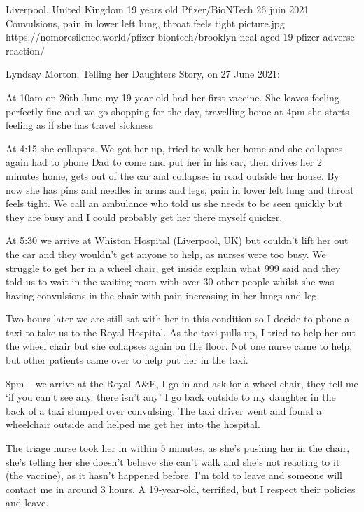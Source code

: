           {Liverpool, United Kingdom}
          {19 years old}
          {Pfizer/BioNTech}
          {26 juin 2021}
          {Convulsions, pain in lower left lung, throat feels tight
          }
          {picture.jpg}
          {https://nomoresilence.world/pfizer-biontech/brooklyn-neal-aged-19-pfizer-adverse-reaction/}
          {

\normalsize

Lyndsay Morton, Telling her Daughters Story, on 27 June 2021:

At 10am on 26th June my 19-year-old had her first vaccine. She leaves feeling
perfectly fine and we go shopping for the day, travelling home at 4pm she starts
feeling as if she has travel sickness

At 4:15 she collapses. We got her up, tried to walk her home and she collapses
again had to phone Dad to come and put her in his car, then drives her 2 minutes
home, gets out of the car and collapses in road outside her house. By now she
has pins and needles in arms and legs, pain in lower left lung and throat feels
tight. We call an ambulance who told us she needs to be seen quickly but they
are busy and I could probably get her there myself quicker.

At 5:30 we arrive at Whiston Hospital (Liverpool, UK) but couldn’t lift her out
the car and they wouldn’t get anyone to help, as nurses were too busy. We
struggle to get her in a wheel chair, get inside explain what 999 said and they
told us to wait in the waiting room with over 30 other people whilst she was
having convulsions in the chair with pain increasing in her lungs and leg.

Two hours later we are still sat with her in this condition so I decide to phone
a taxi to take us to the Royal Hospital. As the taxi pulls up, I tried to help
her out the wheel chair but she collapses again on the floor. Not one nurse came
to help, but other patients came over to help put her in the taxi.

8pm – we arrive at the Royal A\&E, I go in and ask for a wheel chair, they tell
me ‘if you can’t see any, there isn’t any’ I go back outside to my daughter in
the back of a taxi slumped over convulsing. The taxi driver went and found a
wheelchair outside and helped me get her into the hospital.

The triage nurse took her in within 5 minutes, as she’s pushing her in the
chair, she’s telling her she doesn’t believe she can’t walk and she’s not
reacting to it (the vaccine), as it hasn’t happened before. I’m told to leave
and someone will contact me in around 3 hours. A 19-year-old, terrified, but I
respect their policies and leave.

}
